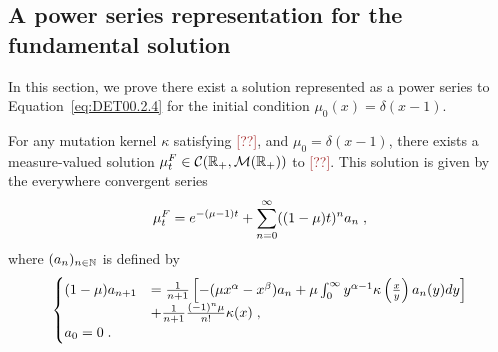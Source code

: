 \documentclass[11pt]{amsart}
\newcommand{\R}{\RR}
\newcommand{\f}{\frac}
\newcommand{\ndr}[1]{\textcolor{brown}{[#1]}}
\begin{document}
\subsection{A power series representation for the fundamental solution}
In this section, we prove there exist a solution represented as a power series to Equation~\eqref{eq:DET00.2.4} for the initial condition $\mu_0(x) = \delta(x-1)$.\\

\begin{theorem}
    For any mutation kernel $\kappa$ satisfying \ndr{??}, and $\mu_0 = \delta(x-1)$, there exists a measure-valued solution $\mu_t^F \in \Ccal(\RR_+, \Mcal(\R_+))$ to \ndr{??}. This solution is given by the everywhere convergent series
    \begin{align}
        \mu_t^F 
        = 
        e^{-(\mu-1)t} + \sum_{n = 0}^\infty ((1-\mu) t)^n a_n
        \; ,
    \end{align}
where $(a_n)_{n \in \mathbb{N}}$ is defined by 
\begin{align*}
    \begin{cases}
    (1-\mu) a_{n+1} 
    &= \frac{1}{n+1}\left[ -(\mu x^{\alpha} - x^\beta) a_n + \mu \int_0^\infty y^{\alpha-1} \kappa \left( \f{x}{y}\right) a_n(y) dy \right] \\
    &+ \frac{1}{n+1} \frac{(-1)^n \mu }{n!}\kappa(x) 
    \eqfinv \\
    a_0 = 0 \eqfinp
    \end{cases}
\end{align*}
\end{theorem}
\end{document}
